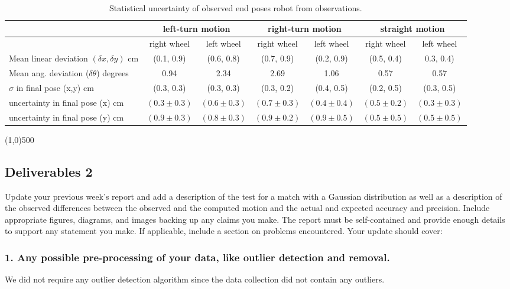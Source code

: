 \documentclass[11pt,a4paper,openright,twoside]{extreport}
\newcommand{\sectionLine}{\begin{center}\line(1,0){500}\end{center}}
\begin{document}
\begin{table}[ht]
\centering
\begin{tabular}{| l | c | c | c | c | c | c |}
\hline
 & \multicolumn{2}{c|}{left-turn motion} & \multicolumn{2}{c|}{ right-turn motion} & \multicolumn{2}{c|}{straight motion} \\
\hline
 & right wheel & left wheel & right wheel & left wheel & right wheel & left wheel \\
\hline
Mean linear deviation $(\delta x, \delta y)$ cm & (0.1, 0.9) & (0.6, 0.8)
& (0.7, 0.9) & (0.2, 0.9) & (0.5, 0.4) & 0.3, 0.4) \\
\hline
Mean ang. deviation ($\delta \theta$) degrees & 0.94 & 2.34 & 2.69 & 1.06 & 0.57 & 0.57 \\
\hline
$\sigma$ in final pose (x,y) cm & (0.3, 0.3) & (0.3, 0.3) & (0.3, 0.2) & (0.4, 0.5) & (0.2, 0.5) & (0.3, 0.5)\\
\hline
uncertainty in final pose (x) cm & $(0.3 \pm 0.3)$ & $(0.6 \pm 0.3)$ & $(0.7 \pm 0.3)$ & $(0.4 \pm 0.4)$ & $(0.5 \pm 0.2)$ & $(0.3 \pm 0.3)$ \\
uncertainty in final pose (y) cm & $(0.9 \pm 0.3)$ & $(0.8 \pm 0.3)$ & $(0.9 \pm 0.2)$ & $(0.9 \pm 0.5)$ & $(0.5 \pm 0.5)$ & $(0.5 \pm 0.5)$ \\
\hline
\end{tabular}
\caption{Statistical uncertainty of observed end poses robot from observations.}
\label{stats}
\end{table}

\sectionLine
\subsection*{Deliverables 2}
Update your previous week’s report and add a description of the test for a match with a Gaussian distribution as well as a description of the observed differences between the observed and the computed motion and the actual and expected accuracy and precision. Include appropriate figures, diagrams, and images backing up any claims you make. The report must be self-contained and provide enough details to support any statement you make. If applicable, include a section on problems encountered. Your update should cover:

\subsubsection*{1. Any possible pre-processing of your data, like outlier detection and removal.}
We did not require any outlier detection algorithm since the data collection did not contain any outliers.
\end{document}

